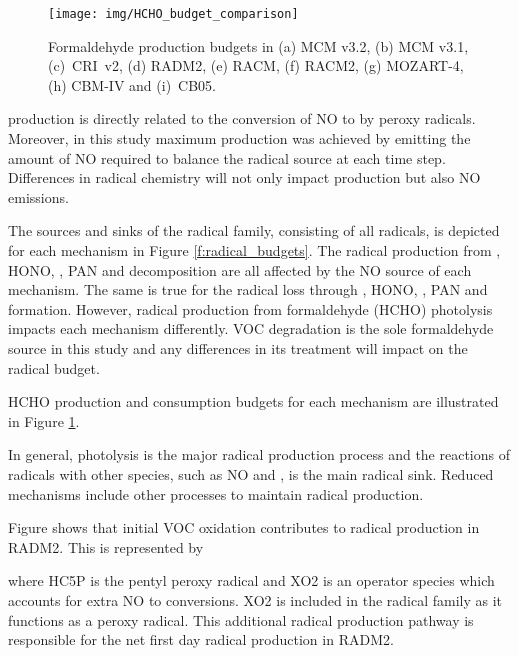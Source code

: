 \begin{figure}
    \centering
    \texttt{[image: img/HCHO\_budget\_comparison]}
    \vspace{0mm}
    \caption{Formaldehyde production budgets in (a) MCM v3.2, (b) MCM v3.1, \mbox{(c) CRI v2}, (d) RADM2, (e) RACM, (f) RACM2, (g) MOZART-4, (h) CBM-IV and \mbox{(i) CB05}.}
    \vspace{-4mm}
    \label{f:HCHO_budgets} 
\end{figure} 

 production is directly related to the conversion of NO to  by peroxy radicals. 
Moreover, in this study maximum  production was achieved by emitting the amount of NO required to balance the radical source at each time step. 
Differences in radical chemistry will not only impact  production but also NO emissions.

The sources and sinks of the radical family, consisting of all radicals, is depicted for each mechanism in Figure \ref{f:radical_budgets}.
The radical production from , HONO, , PAN and  decomposition are all affected by the NO source of each mechanism.
The same is true for the radical loss through , HONO, , PAN and  formation.
However, radical production from formaldehyde (HCHO) photolysis impacts each mechanism differently.
VOC degradation is the sole formaldehyde source in this study and any differences in its treatment will impact on the radical budget.

HCHO production and consumption budgets for each mechanism are illustrated in Figure \ref{f:HCHO_budgets}.

In general, photolysis is the major radical production process and the reactions of radicals with other species, such as NO and , is the main radical sink. 
Reduced mechanisms include other processes to maintain radical production.

Figure shows that initial VOC oxidation contributes to radical production in RADM2. 
This is represented by
\begin{reactionlist}
\end{reactionlist}
where HC5P is the pentyl peroxy radical and XO2 is an operator species which accounts for extra NO to  conversions. 
XO2 is included in the radical family as it functions as a peroxy radical. 
This additional radical production pathway is responsible for the net first day radical production in RADM2.

